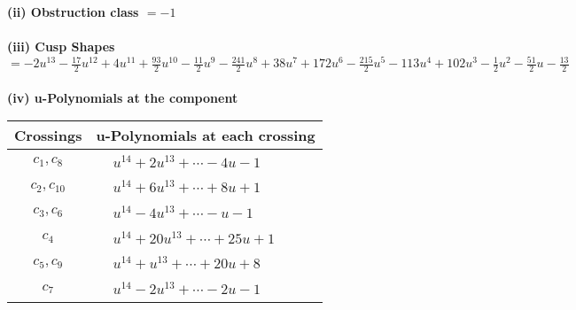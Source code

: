 \documentclass[1p]{elsarticle_modified}
\theoremstyle{definition}
\begin{document}
\flushleft \textbf{(ii) Obstruction class $= -1$}\\~\\
\flushleft \textbf{(iii) Cusp Shapes $= -2 u^{13}-\frac{17}{2} u^{12}+4 u^{11}+\frac{93}{2} u^{10}-\frac{11}{2} u^9-\frac{241}{2} u^8+38 u^7+172 u^6-\frac{215}{2} u^5-113 u^4+102 u^3-\frac{1}{2} u^2-\frac{51}{2} u-\frac{13}{2}$}\\~\\
\newpage\renewcommand{\arraystretch}{1}
\flushleft \textbf{(iv) u-Polynomials at the component}\newline \\
\begin{tabular}{m{50pt}|m{274pt}}
Crossings & \hspace{64pt}u-Polynomials at each crossing \\
\hline $$\begin{aligned}c_{1},c_{8}\end{aligned}$$&$\begin{aligned}
&u^{14}+2 u^{13}+\cdots-4 u-1
\end{aligned}$\\
\hline $$\begin{aligned}c_{2},c_{10}\end{aligned}$$&$\begin{aligned}
&u^{14}+6 u^{13}+\cdots+8 u+1
\end{aligned}$\\
\hline $$\begin{aligned}c_{3},c_{6}\end{aligned}$$&$\begin{aligned}
&u^{14}-4 u^{13}+\cdots- u-1
\end{aligned}$\\
\hline $$\begin{aligned}c_{4}\end{aligned}$$&$\begin{aligned}
&u^{14}+20 u^{13}+\cdots+25 u+1
\end{aligned}$\\
\hline $$\begin{aligned}c_{5},c_{9}\end{aligned}$$&$\begin{aligned}
&u^{14}+u^{13}+\cdots+20 u+8
\end{aligned}$\\
\hline $$\begin{aligned}c_{7}\end{aligned}$$&$\begin{aligned}
&u^{14}-2 u^{13}+\cdots-2 u-1
\end{aligned}$\\
\hline
\end{tabular}\\~\\
\end{document}
